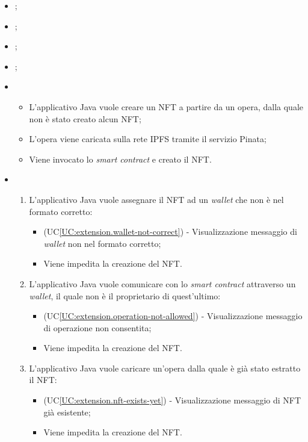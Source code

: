 \begin{itemize}
  \item {};
  \item {};
  \item {};
  \item {};
  \item \UCMain
  \begin{itemize}
    \item L'applicativo Java vuole creare un NFT a partire da un opera, dalla quale non è stato creato alcun NFT;
    \item L'opera viene caricata sulla rete IPFS tramite il servizio Pinata;
    \item Viene invocato lo \textit{smart contract} e creato il NFT.
  \end{itemize}
  \item \UCExt
  \begin{enumerate}[label=\lett]
    \item L'applicativo Java vuole assegnare il NFT ad un \textit{wallet} che non è nel formato corretto:
    \begin{itemize}
      \item (UC\ref{UC:extension.wallet-not-correct}) - Visualizzazione messaggio di \textit{wallet} non nel formato corretto;
      \item Viene impedita la creazione del NFT.
    \end{itemize}

    \item L'applicativo Java vuole comunicare con lo \textit{smart contract} attraverso un \textit{wallet}, il quale non è il proprietario di quest'ultimo:
    \begin{itemize}
      \item (UC\ref{UC:extension.operation-not-allowed}) - Visualizzazione messaggio di operazione non consentita;
      \item Viene impedita la creazione del NFT.
    \end{itemize}

    \item L'applicativo Java vuole caricare un'opera dalla quale è già stato estratto il NFT:
    \begin{itemize}
      \item (UC\ref{UC:extension.nft-exists-yet}) - Visualizzazione messaggio di NFT già esistente;
      \item Viene impedita la creazione del NFT.
    \end{itemize}
  \end{enumerate}
\end{itemize}


